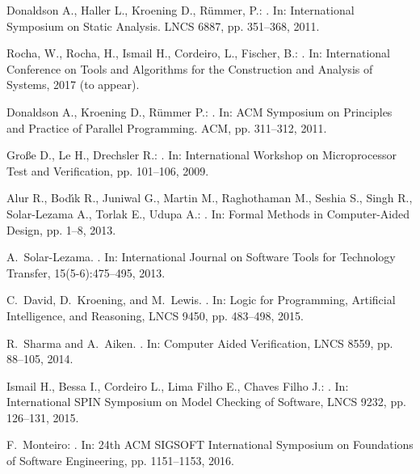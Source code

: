 \documentclass{acm_sen_article}
\begin{document}
{{\begin{thebibliography}{1}
Donaldson A., Haller L., Kroening D., R{\"{u}}mmer, P.:
.
\newblock In: International Symposium on Static Analysis. LNCS 6887, pp. 351--368, 2011.

Rocha, W., Rocha, H., Ismail H., Cordeiro, L., Fischer, B.:
. 
\newblock In: International Conference on Tools and Algorithms for the Construction and Analysis of Systems, 2017 (to appear).

Donaldson A., Kroening D., R{\"{u}}mmer P.:
.
\newblock In: ACM Symposium on Principles and Practice of Parallel Programming. ACM, pp. 311--312, 2011.

Gro{\ss}e D., Le H., Drechsler R.:
.
\newblock In: International Workshop on Microprocessor Test and Verification, pp. 101--106, 2009.

Alur R., Bod\'{\i}k R., Juniwal G., Martin M., Raghothaman M., Seshia S., Singh R., Solar-Lezama A., Torlak E., Udupa A.:
. 
\newblock In: Formal Methods in Computer-Aided Design, pp. 1--8, 2013.

A.~Solar-Lezama.
.
\newblock In: International Journal on Software Tools for Technology Transfer, 15(5-6):475--495, 2013.

C.~David, D.~Kroening, and M.~Lewis.
.
\newblock In: Logic for Programming, Artificial Intelligence, and Reasoning, LNCS 9450, pp. 483--498, 2015.

R.~Sharma and A.~Aiken.
.
\newblock In: Computer Aided Verification, LNCS 8559, pp. 88--105, 2014.

Ismail H., Bessa I., Cordeiro L., Lima Filho E., Chaves Filho J.:
. 
\newblock In: International SPIN Symposium on Model Checking of Software, LNCS 9232, pp. 126--131, 2015.

F.~Monteiro:
. 
\newblock In: 24th {ACM} {SIGSOFT} International Symposium on Foundations of Software Engineering, pp. 1151--1153, 2016.


\end{thebibliography}}}
\end{document}
